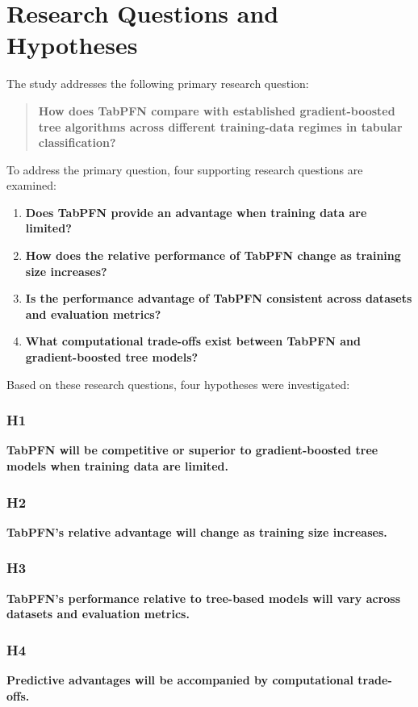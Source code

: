 \section{Research Questions and Hypotheses}\label{research-questions-and-hypotheses}

The study addresses the following primary research question:

\begin{quote}
\textbf{How does TabPFN compare with established gradient-boosted tree algorithms across different training-data regimes in tabular classification?}
\end{quote}

To address the primary question, four supporting research questions are examined:

\begin{enumerate}
\def\labelenumi{\arabic{enumi}.}
\item
  \textbf{Does TabPFN provide an advantage when training data are limited?}
\item
  \textbf{How does the relative performance of TabPFN change as training size increases?}
\item
  \textbf{Is the performance advantage of TabPFN consistent across datasets and evaluation metrics?}
\item
  \textbf{What computational trade-offs exist between TabPFN and gradient-boosted tree models?}
\end{enumerate}

Based on these research questions, four hypotheses were investigated:

\subsubsection{H1}\label{h1}

\textbf{TabPFN will be competitive or superior to gradient-boosted tree models when training data are limited.}

\subsubsection{H2}\label{h2}

\textbf{TabPFN's relative advantage will change as training size increases.}

\subsubsection{H3}\label{h3}

\textbf{TabPFN's performance relative to tree-based models will vary across datasets and evaluation metrics.}

\subsubsection{H4}\label{h4}

\textbf{Predictive advantages will be accompanied by computational trade-offs.}
